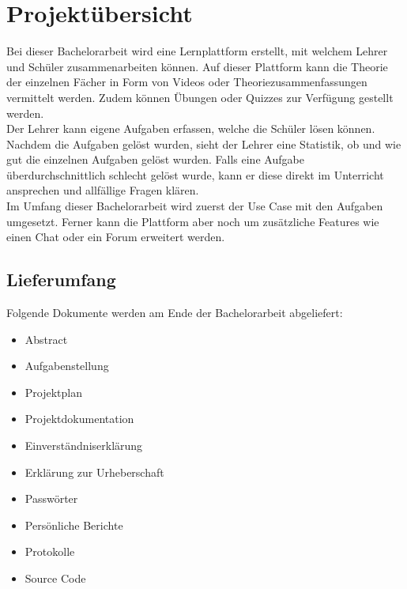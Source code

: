 \section{Projektübersicht}
Bei dieser Bachelorarbeit wird eine Lernplattform erstellt, mit welchem Lehrer und Schüler zusammenarbeiten können. Auf dieser Plattform kann die Theorie der einzelnen Fächer in Form von Videos oder Theoriezusammenfassungen vermittelt werden. Zudem können Übungen oder Quizzes zur Verfügung gestellt werden. \\
Der Lehrer kann eigene Aufgaben erfassen, welche die Schüler lösen können. Nachdem die Aufgaben gelöst wurden, sieht der Lehrer eine Statistik, ob und wie gut die einzelnen Aufgaben gelöst wurden. Falls eine Aufgabe überdurchschnittlich schlecht gelöst wurde, kann er diese direkt im Unterricht ansprechen und allfällige Fragen klären. \\
Im Umfang dieser Bachelorarbeit wird zuerst der Use Case mit den Aufgaben umgesetzt. Ferner kann die Plattform aber noch um zusätzliche Features wie einen Chat oder ein Forum erweitert werden.




\subsection{Lieferumfang}
Folgende Dokumente werden am Ende der Bachelorarbeit abgeliefert:
\begin{itemize}
	\itemsep0em
	\item Abstract
	\item Aufgabenstellung
	\item Projektplan
	\item Projektdokumentation
	\item Einverständniserklärung
	\item Erklärung zur Urheberschaft
	\item Passwörter
	\item Persönliche Berichte
	\item Protokolle
	\item Source Code	
\end{itemize}

\newpage